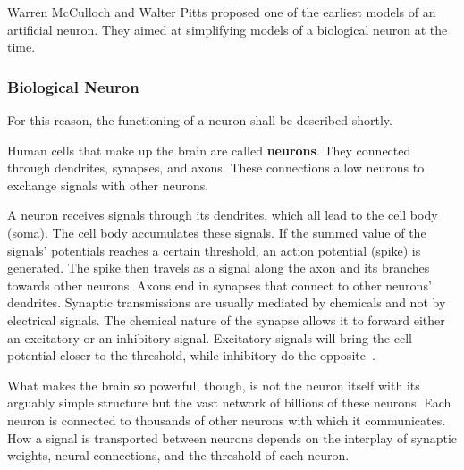 Warren McCulloch and Walter Pitts proposed one of the earliest models of an artificial neuron.
They aimed at simplifying models of a biological neuron at the time.

\subsubsection{Biological Neuron}
For this reason, the functioning of a neuron shall be described shortly.

Human cells that make up the brain are called \textbf{neurons}.
They connected through dendrites, synapses, and axons.
These connections allow neurons to exchange signals with other neurons.

A neuron receives signals through its dendrites, which all lead to the cell body (soma).
The cell body accumulates these signals.
If the summed value of the signals' potentials reaches a certain threshold, an action potential (spike) is generated.
The spike then travels as a signal along the axon and its branches towards other neurons.
Axons end in synapses that connect to other neurons' dendrites.
Synaptic transmissions are usually mediated by chemicals and not by electrical signals.
The chemical nature of the synapse allows it to forward either an excitatory or an inhibitory signal.
Excitatory signals will bring the cell potential closer to the threshold, while inhibitory do the opposite~\cite[p.~42]{coloratlas}.

What makes the brain so powerful, though, is not the neuron itself with its arguably simple structure but the vast network of billions of these neurons.
Each neuron is connected to thousands of other neurons with which it communicates.
How a signal is transported between neurons depends on the interplay of synaptic weights, neural connections, and the threshold of each neuron.

